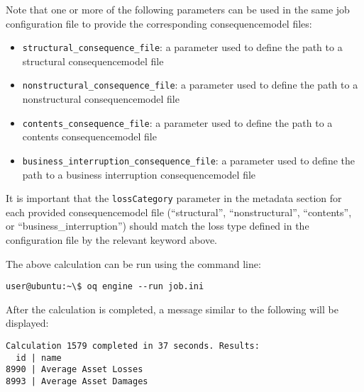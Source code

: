 Note that one or more of the following parameters can be used in the same job
configuration file to provide the corresponding \gls{consequencemodel} files:

\begin{itemize}

  \item \Verb+structural_consequence_file+: a parameter used to define the path
    to a structural \gls{consequencemodel} file

  \item \Verb+nonstructural_consequence_file+: a parameter used to define the path
    to a nonstructural \gls{consequencemodel} file

  \item \Verb+contents_consequence_file+: a parameter used to define the path
    to a contents \gls{consequencemodel} file

  \item \Verb+business_interruption_consequence_file+: a parameter used to define
    the path to a business interruption \gls{consequencemodel} file

\end{itemize}

It is important that the \Verb+lossCategory+ parameter in the metadata section
for each provided \gls{consequencemodel} file (``structural'', ``nonstructural'',
``contents'', or ``business\_interruption'') should match the loss type
defined in the configuration file by the relevant keyword above.

The above calculation can be run using the command line:

\begin{verbatim}
user@ubuntu:~\$ oq engine --run job.ini
\end{verbatim}

After the calculation is completed, a message similar to the following will be
displayed:

\begin{verbatim}
Calculation 1579 completed in 37 seconds. Results:
  id | name
8990 | Average Asset Losses
8993 | Average Asset Damages
\end{verbatim}
